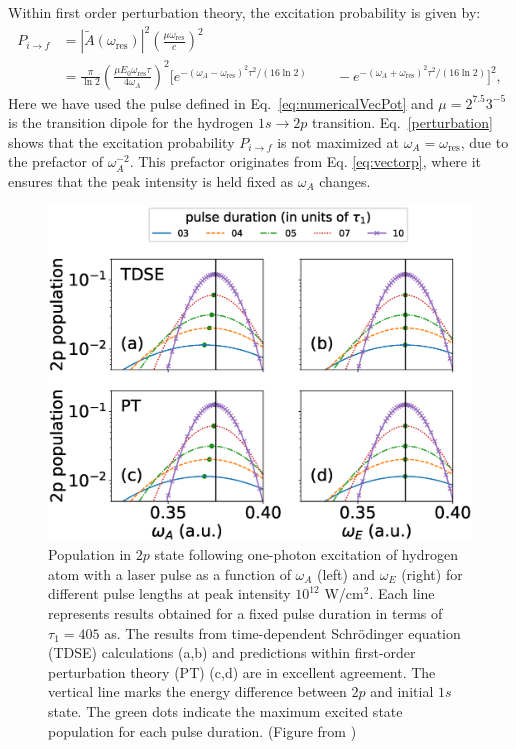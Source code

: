 Within first order perturbation theory, the excitation probability is given by:
\begin{equation}
\begin{split}
P_{i\rightarrow f}&= |\tilde{A}(\omega_\text{res})|^2\left(\frac{\mu\omega_\text{res}}{c}\right)^2 \\
&=\frac{\pi}{\ln{2}}\left(\frac{\mu E_0\omega_\text{res}\tau}{4\omega_A}\right)^2
\Big[e^{-(\omega_A-\omega_\text{res})^2\tau^2/(16\ln{2})}
\qquad -
e^{-(\omega_A+\omega_\text{res})^2\tau^2/(16\ln{2})}
\Big]^2,
\end{split}
\label{perturbation}
\end{equation}
Here we have used the pulse defined in Eq.~\ref{eq:numericalVecPot} and $\mu=2^{7.5}3^{-5}$ is the transition dipole for the hydrogen $1s\rightarrow 2p$ transition. Eq.~\ref{perturbation} shows that the excitation probability $P_{i\rightarrow f}$ is not maximized at  $\omega_A=\omega_\text{res}$, due to the prefactor of $\omega_A^{-2}$. This prefactor originates from Eq. \ref{eq:vectorp}, where it ensures that the peak intensity is held fixed as $\omega_A$ changes.

\begin{figure}[!ht]
\centering
    \includegraphics[width=0.8\linewidth]{figs/Frequency_shift/2p_population_comb.eps}
\caption{
Population in $2p$ state following one-photon excitation of hydrogen atom with a laser pulse as a function of $\omega_A$ (left) and $\omega_E$ (right) for different pulse lengths at peak intensity $10^{12}$ W/cm$^2$. Each line represents results obtained for a fixed pulse duration in terms of $\tau_1=405$ as. The results from time-dependent Schr\"odinger equation (TDSE) calculations (a,b) and predictions within first-order perturbation theory (PT) (c,d) are in excellent agreement. The vertical line marks the energy difference between $2p$ and initial $1s$ state. The green dots indicate the maximum excited state population for each pulse duration. (Figure from \cite{venzke2018_Central})
}
  \label{fig:h-excited_2p}
\end{figure}

